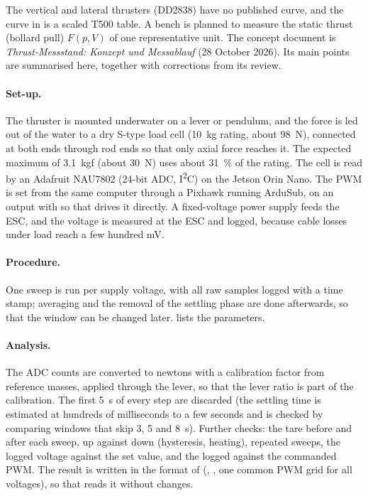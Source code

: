 \begin{revised}[title=Added 28 October 2026,breakable]
The vertical and lateral thrusters (DD2838) have no published curve, and the curve in
 is a scaled T500 table. A bench
is planned to measure the static thrust (bollard pull) $F(p, V)$ of one representative unit.
The concept document is \emph{Thrust-Messstand: Konzept und Messablauf} (28 October 2026). Its
main points are summarised here, together with corrections from its review.

\paragraph{Set-up.} The thruster is mounted underwater on a lever or pendulum, and the force is
led out of the water to a dry S-type load cell (\qty{10}{\kilogram} rating, about
\qty{98}{\newton}), connected at both ends through rod ends so that only axial force reaches it.
The expected maximum of \qty{3.1}{kgf} (about \qty{30}{\newton}) uses about \qty{31}{\percent} of
the rating. The cell is read by an Adafruit NAU7802 (24-bit ADC, I\textsuperscript{2}C) on the
Jetson Orin Nano. The PWM is set from the same computer through a Pixhawk running ArduSub,
on an output with  so that  drives it
directly. A fixed-voltage power supply feeds the ESC, and the voltage is measured at the ESC
and logged, because cable losses under load reach a few hundred \si{\milli\volt}.

\paragraph{Procedure.} One sweep is run per supply voltage, with all raw samples logged with a
time stamp; averaging and the removal of the settling phase are done afterwards, so that the
window can be changed later.  lists the parameters.

\paragraph{Analysis.} The ADC counts are converted to newtons with a calibration factor from
reference masses, applied through the lever, so that the lever ratio is part of the calibration.
The first \qty{5}{\second} of every step are discarded (the settling time is estimated at
hundreds of milliseconds to a few seconds and is checked by comparing windows that skip 3, 5 and
\qty{8}{\second}). Further checks: the tare before and after each sweep, up against down
(hysteresis, heating), repeated sweeps, the logged voltage against the set value, and the logged
 against the commanded PWM. The result is written in the format of
 (, , one common PWM grid for
all voltages), so that  reads it without changes.


\end{revised}
